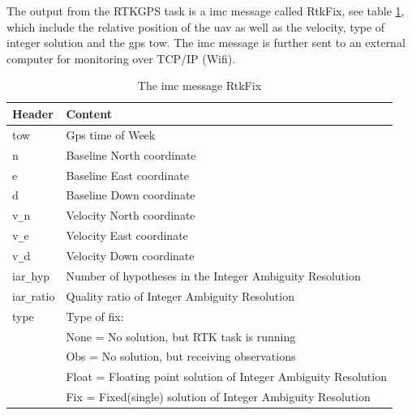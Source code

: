 The output from the RTKGPS task is a \gls{imc} message called RtkFix, see table \ref{Tb:RtkFix}, which include the relative position of the \gls{uav} as well as the velocity, type of integer solution and the \gls{gps} \acrfull{tow}. The \gls{imc} message is further sent to an external computer for monitoring over TCP/IP (Wifi).
\begin{table}[!h]
\begin{center}
    \begin{tabular}{ | l | l |}
    \hline
    \textbf{Header} & \textbf{Content} \\ \hline
     tow & Gps time of Week  \\ \hline
     n & Baseline North coordinate \\ \hline
     e & Baseline East coordinate \\ \hline
     d & Baseline Down coordinate \\ \hline
     v\verb=_=n & Velocity North coordinate \\ \hline
     v\verb=_=e & Velocity East coordinate \\ \hline
     v\verb=_=d & Velocity Down coordinate \\ \hline
     iar\verb=_=hyp & Number of hypotheses in the Integer Ambiguity Resolution \\ \hline
     iar\verb=_=ratio & Quality ratio of Integer Ambiguity Resolution \\ \hline
     type & Type of fix: \\& None = No solution, but RTK task is running
     \\& Obs = No solution, but receiving observations
     \\& Float = Floating point solution of Integer Ambiguity Resolution
     \\& Fix = Fixed(single) solution of Integer Ambiguity Resolution \\ \hline
    \end{tabular}
\end{center}
\caption{The \gls{imc} message RtkFix }
\label{Tb:RtkFix}
\end{table}

